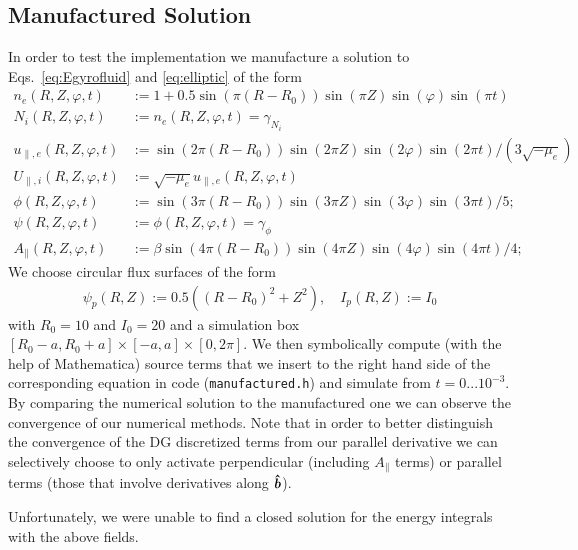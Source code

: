\subsection{Manufactured Solution}
In order to test the implementation we manufacture a solution to Eqs.~\eqref{eq:Egyrofluid} and \eqref{eq:elliptic} of the form
\begin{align*}
n_e(R,Z,\varphi, t) &:= 1 + 0.5\sin(\pi(R-R_0))\sin(\pi Z)\sin(\varphi)\sin(\pi t) \\
N_i(R,Z,\varphi, t) &:= n_e(R,Z,\varphi,t) = \gamma_{ N_i}  \\
u_{\parallel,e}(R,Z,\varphi, t) &:= \sin(2\pi(R-R_0))\sin(2\pi Z)\sin(2\varphi)\sin(2\pi t)/(3\sqrt{-\mu_e}) \\
U_{\parallel,i}(R,Z,\varphi, t) &:= \sqrt{-\mu_e}u_{\parallel,e}(R,Z,\varphi,t) \\
\phi(R,Z,\varphi,t) &:= \sin(3\pi(R-R_0))\sin(3\pi Z)\sin(3\varphi)\sin(3\pi t)/5; \\
\psi(R,Z,\varphi,t) &:= \phi(R,Z,\varphi, t) = \gamma_{\phi} \\
A_\parallel( R,Z,\varphi,t) &:= \beta\sin(4\pi(R-R_0))\sin(4\pi Z)\sin(4\varphi)\sin(4\pi t)/4;
\end{align*}
We choose circular flux surfaces of the form
\begin{align*}
\psi_p(R,Z) :=0.5((R-R_0)^2 + Z^2),\quad
I_p(R,Z):=I_0
\end{align*}
with $R_0=10$ and $I_0=20$ and a simulation box $[R_0-a,R_0+a]\times[-a,a]\times[0,2\pi]$.
We then symbolically compute (with the help of Mathematica) source terms that we insert to the right hand side of
the corresponding equation in code (\texttt{manufactured.h}) and simulate from $t=0...10^{-3}$.
By comparing the numerical solution to the manufactured one we can observe the convergence of our numerical methods. Note that in order to better distinguish
the convergence of the DG discretized terms from our parallel derivative
we can selectively choose to only activate perpendicular (including $A_\parallel$ terms) or parallel terms (those that involve derivatives along $\bm{\hat{b}}$).

Unfortunately, we were unable to find a closed solution for the energy integrals with the above fields.

